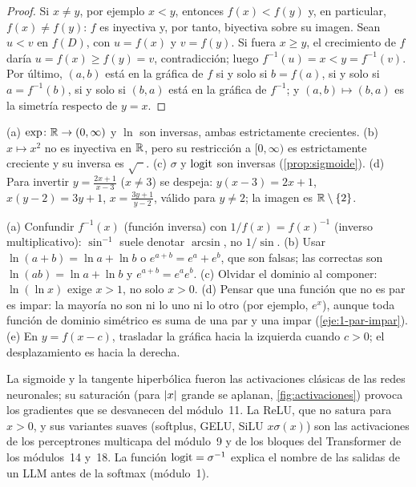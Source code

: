 \begin{proof}
Si $x\ne y$, por ejemplo $x<y$, entonces $f(x)<f(y)$ y, en particular, $f(x)\ne f(y)$: $f$ es inyectiva y, por tanto, biyectiva sobre su imagen. Sean $u<v$ en $f(D)$, con $u=f(x)$ y $v=f(y)$. Si fuera $x\ge y$, el crecimiento de $f$ daría $u=f(x)\ge f(y)=v$, contradicción; luego $f^{-1}(u)=x<y=f^{-1}(v)$. Por último, $(a,b)$ está en la gráfica de $f$ si y solo si $b=f(a)$, si y solo si $a=f^{-1}(b)$, si y solo si $(b,a)$ está en la gráfica de $f^{-1}$; y $(a,b)\mapsto(b,a)$ es la simetría respecto de $y=x$.
\end{proof}

\begin{ejemplo}\label{ej:inversas}
(a) $\exp\colon\mathbb{R}\to(0,\infty)$ y $\ln$ son inversas, ambas estrictamente crecientes. (b) $x\mapsto x^{2}$ no es inyectiva en $\mathbb{R}$, pero su restricción a $[0,\infty)$ es estrictamente creciente y su inversa es $\sqrt{\phantom{x}}$. (c) $\sigma$ y $\operatorname{logit}$ son inversas (\cref{prop:sigmoide}). (d) Para invertir $y=\frac{2x+1}{x-3}$ ($x\ne3$) se despeja: $y(x-3)=2x+1$, $x(y-2)=3y+1$, $x=\frac{3y+1}{y-2}$, válido para $y\ne2$; la imagen es $\mathbb{R}\setminus\{2\}$.
\end{ejemplo}

\begin{observacion}\label{obs:1-errores}
(a) Confundir $f^{-1}(x)$ (función inversa) con $1/f(x)=f(x)^{-1}$ (inverso multiplicativo): $\sin^{-1}$ suele denotar $\arcsin$, no $1/\sin$.
(b) Usar $\ln(a+b)=\ln a+\ln b$ o $e^{a+b}=e^{a}+e^{b}$, que son falsas; las correctas son $\ln(ab)=\ln a+\ln b$ y $e^{a+b}=e^{a}e^{b}$.
(c) Olvidar el dominio al componer: $\ln(\ln x)$ exige $x>1$, no solo $x>0$.
(d) Pensar que una función que no es par es impar: la mayoría no son ni lo uno ni lo otro (por ejemplo, $e^{x}$), aunque toda función de dominio simétrico es suma de una par y una impar (\cref{eje:1-par-impar}).
(e) En $y=f(x-c)$, trasladar la gráfica hacia la izquierda cuando $c>0$; el desplazamiento es hacia la derecha.
\end{observacion}

\begin{observacion}
La sigmoide y la tangente hiperbólica fueron las activaciones clásicas de las redes neuronales; su saturación (para $\lvert x\rvert$ grande se aplanan, \cref{fig:activaciones}) provoca los gradientes que se desvanecen del módulo~11. La ReLU, que no satura para $x>0$, y sus variantes suaves (softplus, GELU, SiLU $x\sigma(x)$) son las activaciones de los perceptrones multicapa del módulo~9 y de los bloques del Transformer de los módulos~14 y~18. La función $\operatorname{logit}=\sigma^{-1}$ explica el nombre de las salidas de un LLM antes de la softmax (módulo~1).
\end{observacion}

